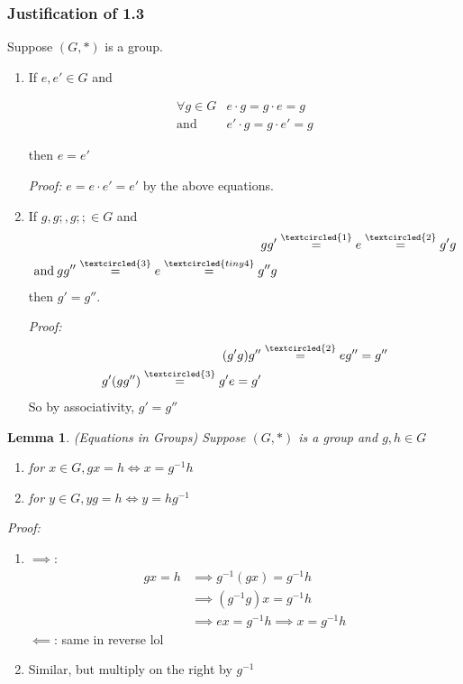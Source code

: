 \documentclass{report}
\newtheorem{lemma}[theorem]{Lemma}
\theoremstyle{remark}
\theoremstyle{definition}
\theoremstyle{definition}
\theoremstyle{theorem}
\begin{document}
\subsubsection{Justification of 1.3}
Suppose $(G,*)$ is a group.
\begin{enumerate}[label=\textcircled{\tiny{\arabic*}}]
    \item If $e,e' \in G$ and
    \begin{center}
        \[\begin{array}{cc}
        \forall g \in G& e\cdot g = g\cdot e = g\\
        \text{and}& e'\cdot g = g\cdot e' = g
        \end{array}
        \]
    \end{center}
    then $e=e'$\par
    \emph{Proof:} $e=e\cdot e'=e'$ by the above equations.
    \item If $g,g;,g;; \in G$ and 
    \begin{align*}
        gg'&\overset{\textcircled{\tiny{1}}}{=}e\overset{\textcircled{\tiny{2}}}{=}g'g\\
        \text{and} \> gg''\overset{\textcircled{\tiny{3}}}{=}e\overset{\textcircled{tiny{4}}}{=}g''g
    \end{align*}
    then $g'=g''$.\par
    \emph{Proof:} \begin{align*}
        (g'g)g''&\overset{\textcircled{\tiny{2}}}{=}eg''=g''\\
        g'(gg'')\overset{\textcircled{\tiny{3}}}{=}g'e=g'
    \end{align*}
    So by associativity, $g'=g''$
\end{enumerate}
\begin{lemma}
\emph{(Equations in Groups)} Suppose $(G,*)$ is a group and $g,h \in G$
\begin{enumerate}[label=\textcircled{\tiny{\arabic*}}]
    \item for $x \in G, gx=h \iff x=g^{-1}h$
    \item for $y \in G, yg=h\iff y=hg^{-1}$
\end{enumerate}
\end{lemma}
\emph{Proof:}
\begin{enumerate}[label=\textcircled{\tiny{\arabic*}}]
    \item $\implies$: \begin{align*}
        gx=h &\implies g^{-1}(gx)=g^{-1}h\\
        &\implies (g^{-1}g)x=g^{-1}h\\
        &\implies ex=g^{-1}h \implies x=g^{-1}h
    \end{align*}
    $\impliedby$: same in reverse lol
    \item Similar, but multiply on the right by $g^{-1}$
\end{enumerate}
\end{document}

